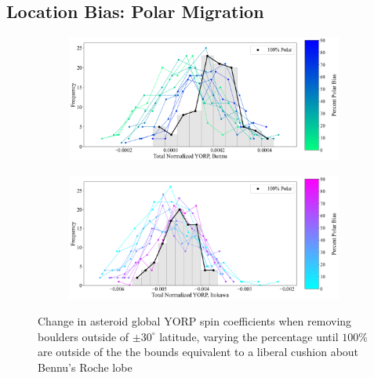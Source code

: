 \subsection{Location Bias: Polar Migration}
\begin{figure}[t!]
    \centering
    \begin{subfigure}{0.49\textwidth}
        \centering
        \includegraphics[width=\textwidth]{fig/bennu_polar_samesize.png}
    \end{subfigure}
    \hfill
    \begin{subfigure}{0.49\textwidth}
        \centering
        \includegraphics[width=\textwidth]{fig/itokawa_polar_samesize.png}
    \end{subfigure}
    \caption{Change in asteroid global YORP spin coefficients when removing boulders outside of $\pm 30^{\circ}$ latitude, varying the percentage until $100\%$ are outside of the the bounds equivalent to a liberal cushion about Bennu's Roche lobe}
    \label{fig:polar_bias}
\end{figure}
